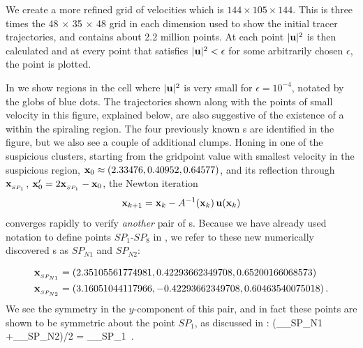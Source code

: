 \documentclass[letter,12pt,openany]{article}
\begin{document}
We create a more refined grid of velocities which is $144 \times 105 
\times 144$. This is three times the 48 $\times$ 35 $\times$ 48 grid in 
each dimension used to show the initial tracer trajectories, and contains 
about 2.2 million points. At each point $|{\bf u}|^{2}$ is then calculated 
and at every point that satisfies $|{\bf u}|^{2} < \epsilon$ for some 
arbitrarily chosen $\epsilon$, the point is plotted. 

In  we show regions in the cell where 
$|{\bf u}|^{2}$ is very small for $\epsilon = 10^{-4}$, notated by the globs 
of blue dots. The trajectories shown along with the points of small 
velocity in this figure, explained below, are also suggestive of the 
existence of a {\stagp} within the spiraling region. The four previously 
known {\stagp}s are identified in the figure, but we also see a couple of 
additional clumps. Honing in one of the suspicious clusters, starting 
from the gridpoint value with smallest velocity in the suspicious region, 
${\bf x}_{0} \approx (2.33476, 0.40952, 0.64577)$, and its reflection through 
$\bold{x}_{_{SP_{1}}}$, ${\bf x}_{0}' =2 \bold{x}_{_{SP_{1}}} - {\bf x}_{0}$, the 
Newton iteration 
\[ %
 \bx_{k+1} = \bx_{k} -
          {\Mvar}^{-1}(\bx_{k}) \, \bu(\bx_{k})
\] %
converges rapidly to verify \textit{another} pair of \stagp s. Because we 
have already used notation to define points $SP_1$-$SP_8$ in 
, we refer to these new numerically discovered 
{\stagp}s as $SP_{N1}$ and $SP_{N2}$: 

\begin{align}
&\bold{x}_{_{SP_{N1}}} =(2.35105561774981,0.42293662349708,0.65200166068573)
\\
&\bold{x}_{_{SP_{N2}}}=(3.16051044117966,-0.42293662349708,0.60463540075018)
\label{eqn:newspNewt}
\,.
\end{align}
We see the
 symmetry in the $y$-component of this pair, and in fact
these points are shown to be
 symmetric about the point $SP_1$, as discussed in :
 \beq
    (_{_{SP_{N1}}} +_{_{SP_{N2}}})/2 = _{_{SP_{1}}}
 \,.
 \eeq

 
\end{document}
